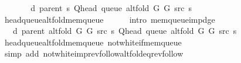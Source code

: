 \begin{isabellebody}
\ \ \isamarkupfalse%
\ \isamarkupfalse%
\ {\isachardoublequoteopen}{\isachardot}{\kern0pt}{\isachardot}{\kern0pt}{\isachardot}{\kern0pt}\ {\isasymle}\ d\ {\isacharparenleft}{\kern0pt}parent\ s{\isacharparenright}{\kern0pt}\ {\isacharparenleft}{\kern0pt}Q{\isacharunderscore}{\kern0pt}head\ {\isacharparenleft}{\kern0pt}queue\ {\isacharparenleft}{\kern0pt}alt{\isacharunderscore}{\kern0pt}fold\ G{}\ G{}\ src\ s{\isacharparenright}{\kern0pt}{\isacharparenright}{\kern0pt}{\isacharparenright}{\kern0pt}{\isachardoublequoteclose}\isanewline
\ \ \ \ \isamarkupfalse%
\ head{\isacharunderscore}{\kern0pt}queue{\isacharunderscore}{\kern0pt}alt{\isacharunderscore}{\kern0pt}fold{\isacharunderscore}{\kern0pt}mem{\isacharunderscore}{\kern0pt}queue\isanewline
\ \ \ \ \isamarkupfalse%
\ {\isacharparenleft}{\kern0pt}intro\ mem{\isacharunderscore}{\kern0pt}queue{\isacharunderscore}{\kern0pt}imp{\isacharunderscore}{\kern0pt}d{\isacharunderscore}{\kern0pt}ge{\isacharparenright}{\kern0pt}\isanewline
\ \ \isamarkupfalse%
\ \isamarkupfalse%
\ {\isachardoublequoteopen}{\isachardot}{\kern0pt}{\isachardot}{\kern0pt}{\isachardot}{\kern0pt}\ {\isacharequal}{\kern0pt}\ d\ {\isacharparenleft}{\kern0pt}parent\ {\isacharparenleft}{\kern0pt}alt{\isacharunderscore}{\kern0pt}fold\ G{}\ G{}\ src\ s{\isacharparenright}{\kern0pt}{\isacharparenright}{\kern0pt}\ {\isacharparenleft}{\kern0pt}Q{\isacharunderscore}{\kern0pt}head\ {\isacharparenleft}{\kern0pt}queue\ {\isacharparenleft}{\kern0pt}alt{\isacharunderscore}{\kern0pt}fold\ G{}\ G{}\ src\ s{\isacharparenright}{\kern0pt}{\isacharparenright}{\kern0pt}{\isacharparenright}{\kern0pt}{\isachardoublequoteclose}\isanewline
\ \ \ \ \isamarkupfalse%
\ head{\isacharunderscore}{\kern0pt}queue{\isacharunderscore}{\kern0pt}alt{\isacharunderscore}{\kern0pt}fold{\isacharunderscore}{\kern0pt}mem{\isacharunderscore}{\kern0pt}queue\ not{\isacharunderscore}{\kern0pt}white{\isacharunderscore}{\kern0pt}if{\isacharunderscore}{\kern0pt}mem{\isacharunderscore}{\kern0pt}queue\isanewline
\ \ \ \ \isamarkupfalse%
\ {\isacharparenleft}{\kern0pt}simp\ add{\isacharcolon}{\kern0pt}\ not{\isacharunderscore}{\kern0pt}white{\isacharunderscore}{\kern0pt}imp{\isacharunderscore}{\kern0pt}rev{\isacharunderscore}{\kern0pt}follow{\isacharunderscore}{\kern0pt}alt{\isacharunderscore}{\kern0pt}fold{\isacharunderscore}{\kern0pt}eq{\isacharunderscore}{\kern0pt}rev{\isacharunderscore}{\kern0pt}follow{\isacharparenright}{\kern0pt}\isanewline

\end{isabellebody}
